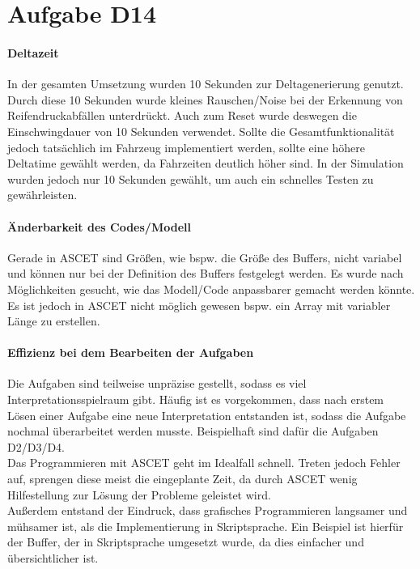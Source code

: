 \chapter{Aufgabe D14}
\subsubsection{Deltazeit}
In der gesamten Umsetzung wurden 10 Sekunden zur Deltagenerierung genutzt. Durch diese 10 Sekunden wurde kleines Rauschen/Noise bei der Erkennung von Reifendruckabfällen unterdrückt. Auch zum Reset wurde deswegen die Einschwingdauer von 10 Sekunden verwendet.
Sollte die Gesamtfunktionalität jedoch tatsächlich im Fahrzeug implementiert werden, sollte eine höhere Deltatime gewählt werden, da Fahrzeiten deutlich höher sind. In der Simulation wurden jedoch nur 10 Sekunden gewählt, um auch ein schnelles Testen zu gewährleisten.

\subsubsection{Änderbarkeit des Codes/Modell}
Gerade in ASCET sind Größen, wie bspw. die Größe des Buffers, nicht variabel und können nur bei der Definition des Buffers festgelegt werden. Es wurde nach Möglichkeiten gesucht, wie das Modell/Code anpassbarer gemacht werden könnte. Es ist jedoch in ASCET nicht möglich gewesen bspw. ein Array mit variabler Länge zu erstellen. 

\subsubsection{Effizienz bei dem Bearbeiten der Aufgaben}
Die Aufgaben sind teilweise unpräzise gestellt, sodass es viel Interpretationsspielraum gibt. Häufig ist es vorgekommen, dass nach erstem Lösen einer Aufgabe eine neue Interpretation entstanden ist, sodass die Aufgabe nochmal überarbeitet werden musste. Beispielhaft sind dafür die Aufgaben D2/D3/D4.\\
Das Programmieren mit ASCET geht im Idealfall schnell. Treten jedoch Fehler auf, sprengen diese meist die eingeplante Zeit, da durch ASCET wenig Hilfestellung zur Lösung der Probleme geleistet wird.\\
Außerdem entstand der Eindruck, dass grafisches Programmieren langsamer und mühsamer ist, als die Implementierung in Skriptsprache. Ein Beispiel ist hierfür der Buffer, der in Skriptsprache umgesetzt wurde, da dies einfacher und übersichtlicher ist.\\

